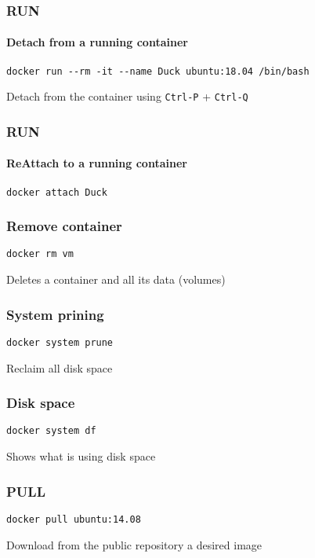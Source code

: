 \begin{frame}[fragile]
\frametitle{RUN}
\framesubtitle{Detach from a running container}

\begin{lstlisting}
docker run --rm -it --name Duck ubuntu:18.04 /bin/bash
\end{lstlisting}
Detach from the container using \lstinline!Ctrl-P! + \lstinline!Ctrl-Q!
\end{frame}

\begin{frame}[fragile]
\frametitle{RUN}
\framesubtitle{ReAttach to a running container}

\begin{lstlisting}
docker attach Duck
\end{lstlisting}

\end{frame}


\begin{frame}[fragile]
\frametitle{Remove container}
\begin{lstlisting}
docker rm vm
\end{lstlisting}

Deletes a container and all its data (volumes) 
\end{frame}


\begin{frame}[fragile]
\frametitle{System prining}
\begin{lstlisting}
docker system prune
\end{lstlisting}

Reclaim all disk space
\end{frame}


\begin{frame}[fragile]
\frametitle{Disk space}
\begin{lstlisting}
docker system df
\end{lstlisting}

Shows what is using disk space
\end{frame}


\begin{frame}[fragile]
\frametitle{PULL}
\begin{lstlisting}
docker pull ubuntu:14.08
\end{lstlisting}

Download from the public repository a desired image
\end{frame}